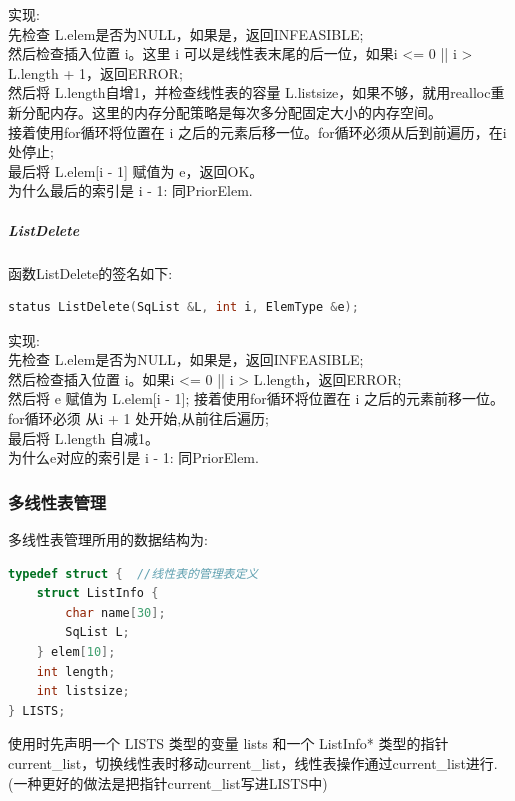 \documentclass[supercite]{Experimental_Report}
\theoremstyle{definition}
\begin{document}
\noindent
实现: \\
先检查 L.elem是否为NULL，如果是，返回INFEASIBLE; \\
然后检查插入位置 i。这里 i 可以是线性表末尾的后一位，如果i <= 0 || i > L.length + 1，返回ERROR; \\
然后将 L.length自增1，并检查线性表的容量 L.listsize，如果不够，就用realloc重新分配内存。这里的内存分配策略是每次多分配固定大小的内存空间。\\
接着使用for循环将位置在 i 之后的元素后移一位。for循环必须从后到前遍历，在i处停止; \\
最后将 L.elem[i - 1] 赋值为 e，返回OK。\\
为什么最后的索引是 i - 1: 同PriorElem.\\

\subparagraph{ListDelete}
\noindent
函数ListDelete的签名如下:
\begin{lstlisting}[language=C++, frame=single]
status ListDelete(SqList &L, int i, ElemType &e);
\end{lstlisting}

\noindent
实现: \\
先检查 L.elem是否为NULL，如果是，返回INFEASIBLE; \\
然后检查插入位置 i。如果i <= 0 || i > L.length，返回ERROR; \\
然后将 e 赋值为 L.elem[i - 1];
接着使用for循环将位置在 i 之后的元素前移一位。for循环必须 从i + 1 处开始,从前往后遍历; \\
最后将 L.length 自减1。\\
为什么e对应的索引是 i - 1: 同PriorElem.\\

\newpage

\subsubsection{多线性表管理}
\noindent
多线性表管理所用的数据结构为:
\begin{lstlisting}[language=C++, frame=single]
typedef struct {  //线性表的管理表定义
    struct ListInfo {
        char name[30];
        SqList L;
    } elem[10];
    int length;
    int listsize;
} LISTS;
\end{lstlisting}
使用时先声明一个 LISTS 类型的变量 lists 和一个 ListInfo* 类型的指针 current\_list，切换线性表时移动current\_list，线性表操作通过current\_list进行.\\
(一种更好的做法是把指针current\_list写进LISTS中) \\
\end{document}
